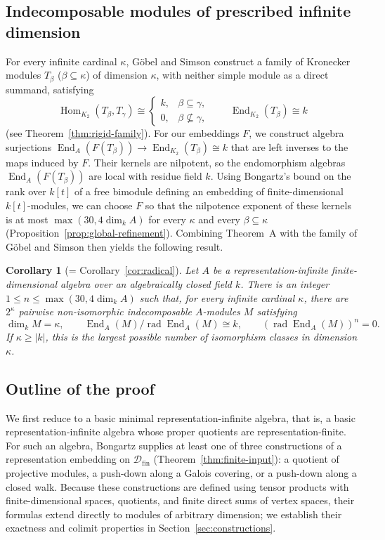 \documentclass[a4paper,reqno,10pt]{amsart}
\newtheorem{corollary}[theorem]{Corollary}
\theoremstyle{definition}
\DeclareMathOperator{\Hom}{Hom}
\DeclareMathOperator{\End}{End}
\DeclareMathOperator{\rad}{rad}
\newcommand{\dm}{\dim_k}
\newcommand{\D}{\mathcal D}
\numberwithin{equation}{section}
\begin{document}
\subsection{Indecomposable modules of prescribed infinite dimension}
For every infinite cardinal $\kappa$, G\"obel and Simson
\cite[Theorem~1.2]{GoebelSimson} construct a family of Kronecker modules $T_\beta$
($\beta\subseteq\kappa$) of dimension $\kappa$, with neither simple module as a direct summand, satisfying
\[
 \Hom_{K_2}(T_\beta,T_\gamma)\cong
 \begin{cases}k,&\beta\subseteq\gamma,\\0,&\beta\nsubseteq\gamma,\end{cases}
 \qquad \End_{K_2}(T_\beta)\cong k
\]
(see Theorem~\ref{thm:rigid-family}).
For our embeddings $F$, we construct algebra surjections
$\End_A(F(T_\beta))\to\End_{K_2}(T_\beta)\cong k$ that are left inverses
to the maps induced by $F$. Their kernels are nilpotent, so the endomorphism
algebras $\End_A(F(T_\beta))$ are local with residue field $k$.
Using Bongartz's bound \cite[Theorem~7]{Bongartz} on the
rank over $k[t]$ of a free bimodule defining an embedding of
finite-dimensional $k[t]$-modules, we can choose $F$ so that the nilpotence
exponent of these kernels is at most
$\max(30,4\dm A)$ for every $\kappa$ and every $\beta\subseteq\kappa$
(Proposition~\ref{prop:global-refinement}). Combining Theorem~A with the
family of G\"obel and Simson then yields the following result.
\begin{corollary}[= Corollary~\ref{cor:radical}]\label{cor:dimension}
Let $A$ be a representation-infinite finite-dimensional algebra over an
algebraically closed field $k$. There is an integer
$1\le n\le\max(30,4\dm A)$ such that, for every infinite cardinal
$\kappa$, there are $2^\kappa$ pairwise non-isomorphic indecomposable
$A$-modules $M$ satisfying
\[
 \dm M=\kappa,\qquad
 \End_A(M)/\rad\End_A(M)\cong k,\qquad
 (\rad\End_A(M))^n=0.
\]
If $\kappa\ge |k|$, this is the largest possible number of isomorphism
classes in dimension $\kappa$.
\end{corollary}

\subsection{Outline of the proof}
\label{sec:outline}
We first reduce to a basic minimal representation-infinite algebra,
that is, a basic representation-infinite algebra whose proper quotients
are representation-finite. For such an algebra, Bongartz \cite[Theorem~6 and its proof]{Bongartz} supplies at least
one of three constructions of a representation embedding on $\D_{\mathrm{fin}}$ (Theorem~\ref{thm:finite-input}):
a quotient of projective modules, a push-down along a Galois covering, or a
push-down along a closed walk. Because these constructions are defined using tensor products with
finite-dimensional spaces, quotients, and finite direct sums of vertex spaces,
their formulas extend directly to modules of arbitrary dimension; we establish their exactness and colimit properties
in Section~\ref{sec:constructions}.
\end{document}
